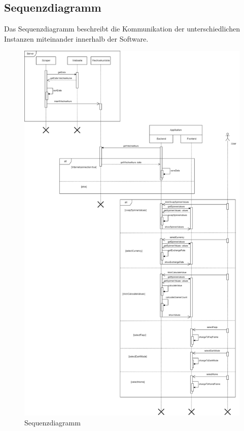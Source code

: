 \documentclass[conference]{IEEEtran}
\begin{document}
\subsection{Sequenzdiagramm}
Das Sequenzdiagramm beschreibt die Kommunikation der unterschiedlichen Instanzen miteinander innerhalb der Software. 

\begin{figure}[h]
	\centering
	\includegraphics[width=1\linewidth, frame]{Sequenzdiagramm.drawio}
	\caption[Sequenzdiagramm]{Sequenzdiagramm}
	\label{fig:sequenzdiagramm}
\end{figure}
\end{document}
